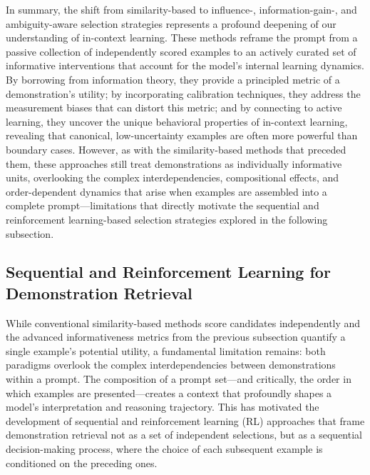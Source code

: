 \documentclass[11pt]{article}
\begin{document}
In summary, the shift from similarity-based to influence-, information-gain-, and ambiguity-aware selection strategies represents a profound deepening of our understanding of in-context learning. These methods reframe the prompt from a passive collection of independently scored examples to an actively curated set of informative interventions that account for the model's internal learning dynamics. By borrowing from information theory, they provide a principled metric of a demonstration's utility; by incorporating calibration techniques, they address the measurement biases that can distort this metric; and by connecting to active learning, they uncover the unique behavioral properties of in-context learning, revealing that canonical, low-uncertainty examples are often more powerful than boundary cases. However, as with the similarity-based methods that preceded them, these approaches still treat demonstrations as individually informative units, overlooking the complex interdependencies, compositional effects, and order-dependent dynamics that arise when examples are assembled into a complete prompt---limitations that directly motivate the sequential and reinforcement learning-based selection strategies explored in the following subsection.

\subsection{Sequential and Reinforcement Learning for Demonstration Retrieval}

While conventional similarity-based methods score candidates independently and the advanced informativeness metrics from the previous subsection quantify a single example's potential utility, a fundamental limitation remains: both paradigms overlook the complex interdependencies between demonstrations within a prompt. The composition of a prompt set---and critically, the order in which examples are presented---creates a context that profoundly shapes a model's interpretation and reasoning trajectory. This has motivated the development of sequential and reinforcement learning (RL) approaches that frame demonstration retrieval not as a set of independent selections, but as a sequential decision-making process, where the choice of each subsequent example is conditioned on the preceding ones.
\end{document}
